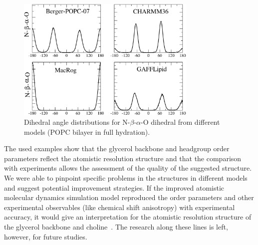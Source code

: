 \documentclass[journal=jacsat,manuscript=article]{achemso}
\begin{document}
\begin{figure}[]
  \centering
  \includegraphics[width=8.6cm]{../Fig/a-bDIHS2.pdf}
  \caption{\label{dihDISTS2}
    Dihedral angle distributions for N-$\beta$-$\alpha$-O dihedral from different models (POPC bilayer in full hydration).
  } 
\end{figure}

The used examples show that the glycerol backbone and headgroup order parameters reflect the atomistic resolution structure
and that the comparison with experiments allows the assessment of the quality of the suggested structure. We were able to pinpoint
specific problems in the structures in different models and suggest potential improvement strategies.
If the improved atomistic
molecular dynamics simulation model reproduced the order parameters and other experimental observables (like chemical shift anisotropy)
with experimental accuracy, it would give an interpretation for the atomistic resolution structure of the glycerol backbone and 
choline~\cite{seelig77b,skarjune79,jacobs80,davis83,akutsu91,hong95b,semchyschyn04}. The research along these lines is left, however,
for future studies.
\end{document}
